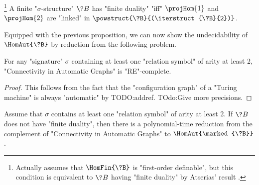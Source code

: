 \begin{proposition}%
	\!\footnote{Actually \cite[Theorem 4.7]{LaroseLotenTardif2007CharacterisationFOCSP} assumes
	that $\HomFin{\?B}$ is "first-order definable", but this condition
	is equivalent to $\?B$ having "finite duality" by Atserias' result
	\cite[Corollary 4]{Atserias2008DigraphColoring}.}%
	\AP\label{prop:characterization-finite-duality-path-projections}
	A finite "$\sigma$-structure" $\?B$ has "finite duality" "iff"
	$\projHom{1}$ and $\projHom{2}$ are "linked" in $\powstruct{\?B}{(\iterstruct{\?B}{2})}$.
\end{proposition}

Equipped with the previous proposition, we can now show the undecidability 
of $\HomAut{\?B}$ by reduction from the following problem.

\begin{property}
	\AP\label{prop:undecidability-connectivity}
	For any "signature" $\sigma$ containing at least one "relation symbol" of
	arity at least 2, "Connectivity in Automatic Graphs" is "RE"-complete.
\end{property}

\begin{proof}
	This follows from the fact that the "configuration graph" of
	a "Turing machine" is always "automatic" by TODO:addref.
	TOdo:Give more precisions.
\end{proof}

\begin{lemma}
	\AP\label{lem:reduction-hom}
	Assume that $\sigma$ contains at least one "relation symbol" of arity at least 2.
	If $\?B$ does not have "finite duality", then there is a polynomial-time reduction 
	from the complement of "Connectivity in Automatic Graphs" to $\HomAut{\marked{\?B}}$.
\end{lemma}

